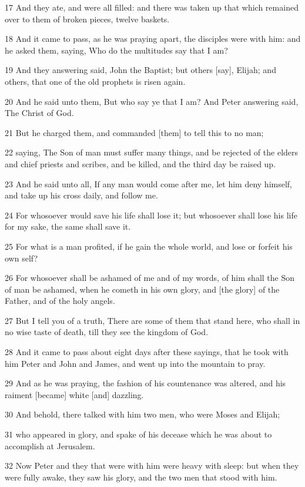 \par 17 And they ate, and were all filled: and there was taken up that which remained over to them of broken pieces, twelve baskets.
\par 18 And it came to pass, as he was praying apart, the disciples were with him: and he asked them, saying, Who do the multitudes say that I am?
\par 19 And they answering said, John the Baptist; but others [say], Elijah; and others, that one of the old prophets is risen again.
\par 20 And he said unto them, But who say ye that I am? And Peter answering said, The Christ of God.
\par 21 But he charged them, and commanded [them] to tell this to no man;
\par 22 saying, The Son of man must suffer many things, and be rejected of the elders and chief priests and scribes, and be killed, and the third day be raised up.
\par 23 And he said unto all, If any man would come after me, let him deny himself, and take up his cross daily, and follow me.
\par 24 For whosoever would save his life shall lose it; but whosoever shall lose his life for my sake, the same shall save it.
\par 25 For what is a man profited, if he gain the whole world, and lose or forfeit his own self?
\par 26 For whosoever shall be ashamed of me and of my words, of him shall the Son of man be ashamed, when he cometh in his own glory, and [the glory] of the Father, and of the holy angels.
\par 27 But I tell you of a truth, There are some of them that stand here, who shall in no wise taste of death, till they see the kingdom of God.
\par 28 And it came to pass about eight days after these sayings, that he took with him Peter and John and James, and went up into the mountain to pray.
\par 29 And as he was praying, the fashion of his countenance was altered, and his raiment [became] white [and] dazzling.
\par 30 And behold, there talked with him two men, who were Moses and Elijah;
\par 31 who appeared in glory, and spake of his decease which he was about to accomplish at Jerusalem.
\par 32 Now Peter and they that were with him were heavy with sleep: but when they were fully awake, they saw his glory, and the two men that stood with him.
